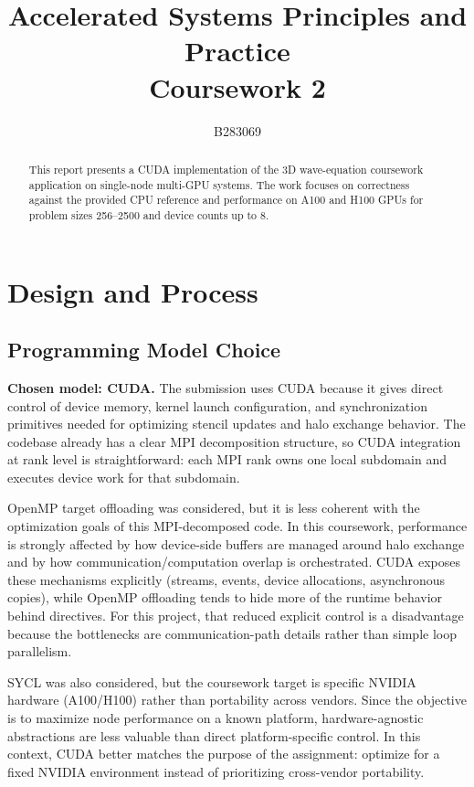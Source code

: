 \documentclass[11pt]{article}
\title{Accelerated Systems Principles and Practice \\ Coursework 2}
\author{B283069\inst{1}}
\begin{document}
\maketitle

\begin{abstract}
This report presents a CUDA implementation of the 3D wave-equation coursework application on single-node multi-GPU systems. The work focuses on correctness against the provided CPU reference and performance on A100 and H100 GPUs for problem sizes 256--2500 and device counts up to 8.
\end{abstract}


\section{Design and Process}

\subsection{Programming Model Choice}
\textbf{Chosen model: CUDA.}
The submission uses CUDA because it gives direct control of device memory, kernel launch configuration, and synchronization primitives needed for optimizing stencil updates and halo exchange behavior. The codebase already has a clear MPI decomposition structure, so CUDA integration at rank level is straightforward: each MPI rank owns one local subdomain and executes device work for that subdomain.

OpenMP target offloading was considered, but it is less coherent with the optimization goals of this MPI-decomposed code. In this coursework, performance is strongly affected by how device-side buffers are managed around halo exchange and by how communication/computation overlap is orchestrated. CUDA exposes these mechanisms explicitly (streams, events, device allocations, asynchronous copies), while OpenMP offloading tends to hide more of the runtime behavior behind directives. For this project, that reduced explicit control is a disadvantage because the bottlenecks are communication-path details rather than simple loop parallelism.

SYCL was also considered, but the coursework target is specific NVIDIA hardware (A100/H100) rather than portability across vendors. Since the objective is to maximize node performance on a known platform, hardware-agnostic abstractions are less valuable than direct platform-specific control. In this context, CUDA better matches the purpose of the assignment: optimize for a fixed NVIDIA environment instead of prioritizing cross-vendor portability.
\end{document}
